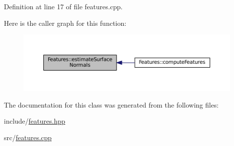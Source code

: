 Definition at line 17 of file features.\+cpp.

Here is the caller graph for this function\+:
\nopagebreak
\begin{figure}[H]
\begin{center}
\leavevmode
\includegraphics[width=350pt]{class_features_a925cf73afb0607d0fe74a47347ec670d_icgraph}
\end{center}
\end{figure}


The documentation for this class was generated from the following files\+:\begin{DoxyCompactItemize}
\item 
include/\hyperlink{features_8hpp}{features.\+hpp}\item 
src/\hyperlink{features_8cpp}{features.\+cpp}\end{DoxyCompactItemize}
